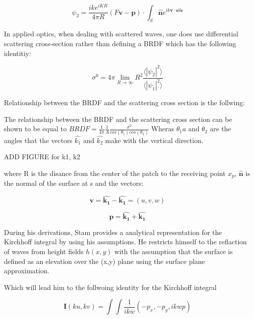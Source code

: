 \begin{equation}
  \psi_2 = \frac{i k e^{i K R}}{4 \pi R}(F\mathbf{v}-\mathbf{p}) \cdot \int_{S} \hat{\mathbf{n}} e^{ik\mathbf{v} \cdot \mathbf{s} d\mathbf{s}}
\end{equation}


In applied optics, when dealing with scattered waves, one does use differential scattering cross-section rather than defining a BRDF which has the following identitiy: 

\begin{equation}
    \sigma^0 = 4 \pi \lim_{R \to \infty} R^2 \frac{\langle \left|\psi_2\right|^2\rangle}{\langle \left|\psi_1\right|^2\rangle}
\end{equation}

Relationship between the BRDF and the scattering cross section is the follwing:

The relationship between the BRDF and the scattering cross section can be shown to be equal to $BRDF = \frac{1}{4\pi}\frac{1}{A}\frac{\sigma^0}{cos(\theta_1)cos(\theta_2)}$
Wheras $\theta_1a$ and $\theta_2$ are the angles that the vectors $\hat{k_1}$
and $\hat{k_2}$ make with the vertical direction.
 
ADD FIGURE for k1, k2

where R is the disance from the center of the patch to the receiving point $x_p$, $\hat{\mathbf{n}}$ is the normal of the surface at s and the vectors:

\begin{equation*}
    \mathbf{v} = \hat{\mathbf{k_1}} - \hat{\mathbf{k_1}}
               = (u,v,w)
\end{equation*}

\begin{equation*}
    \mathbf{p} = \hat{\mathbf{k_1}} + \hat{\mathbf{k_1}}
\end{equation*}


During his derivations, Stam provides a analytical representation for the Kirchhoff integral by using his assumptions. He restricts himself to the reflaction of waves from height fields $h(x,y)$ with the assumption that the surface is defined as an elevation over the (x,y) plane using the surface plane approximation.

Which will lead him to the follwoing identity for the Kirchhoff integral

\begin{equation}
    \mathbf{I}(ku, kv) = \int \int \frac{1}{ikw}(-p_x, -p_y, ikwp) 
\end{equation}

